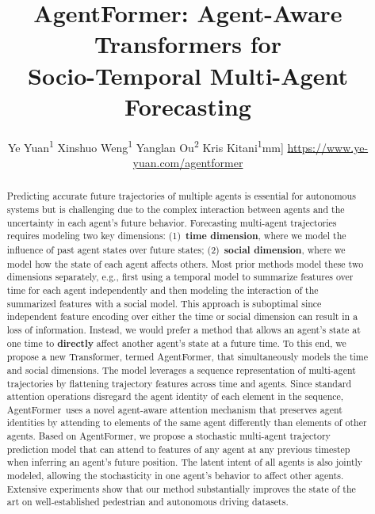 \documentclass[10pt,twocolumn,letterpaper]{article}
\newcommand{\mname}{AgentFormer}
\begin{document}
\title{\mname: Agent-Aware Transformers for\\Socio-Temporal Multi-Agent Forecasting}

\author{
Ye Yuan\textsuperscript{1} \qquad Xinshuo Weng\textsuperscript{1} \qquad Yanglan Ou\textsuperscript{2} \qquad Kris Kitani\textsuperscript{1}\1mm]
{ \url{https://www.ye-yuan.com/agentformer}} \\
}

\maketitle
\ificcvfinal\thispagestyle{empty}\fi

\begin{abstract}
\vspace{-3mm}
    Predicting accurate future trajectories of multiple agents is essential for autonomous systems but is challenging due to the complex interaction between agents and the uncertainty in each agent's future behavior. Forecasting multi-agent trajectories requires modeling two key dimensions:
    (1)~\textbf{time dimension}, where we model the influence of past agent states over future states; (2)~\textbf{social dimension}, where we model how the state of each agent affects others.
    Most prior methods model these two dimensions separately, e.g., first using a temporal model to summarize features over time for each agent independently and then modeling the interaction of the summarized features with a social model. This approach is suboptimal since independent feature encoding over either the time or social dimension can result in a loss of information. Instead, we would prefer a method that allows an agent's state at one time to \textbf{directly} affect another agent's state at a future time.
    To this end, we propose a new Transformer, termed \mname, that simultaneously models the time and social dimensions. The model leverages a sequence representation of multi-agent trajectories by flattening trajectory features across time and agents. Since standard attention operations disregard the agent identity of each element in the sequence, \mname\ uses a novel agent-aware attention mechanism that preserves agent identities by attending to elements of the same agent differently than elements of other agents. Based on \mname, we propose a stochastic multi-agent trajectory prediction model that can attend to features of any agent at any previous timestep when inferring an agent's future position. The latent intent of all agents is also jointly modeled, allowing the stochasticity in one agent's behavior to affect other agents. Extensive experiments show that our method substantially improves the state of the art on well-established pedestrian and autonomous driving datasets.
\end{abstract}
\end{document}
